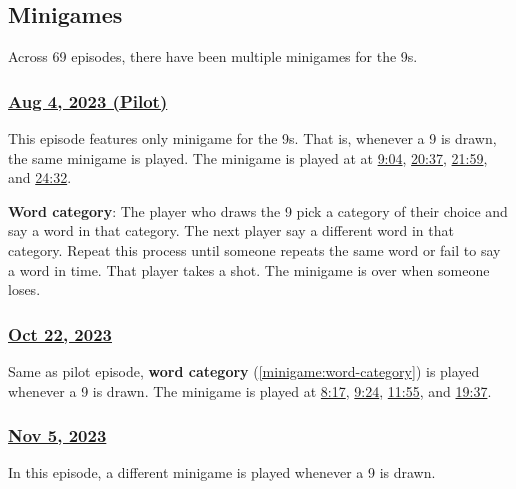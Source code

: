 \documentclass{article}
\begin{document}
\subsection{Minigames}

Across 69 episodes, there have been multiple minigames for the 9s.

\subsubsection{\href{https://www.youtu.be.com/lFEmz4D7Tao}{Aug 4, 2023 (Pilot)}}


This episode features only minigame for the 9s. That is, whenever a 9 is drawn, the same minigame is played. The minigame is played at at \href{https://youtu.be/lFEmz4D7Tao?t=544}{9:04}, \href{https://youtu.be/lFEmz4D7Tao?t=1237}{20:37}, \href{https://youtu.be/lFEmz4D7Tao?t=1319}{21:59}, and \href{https://youtu.be/lFEmz4D7Tao?t=1472}{24:32}.

\textbf{Word category}: The player who draws the 9 pick a category of their choice and say a word in that category. The next player say a different word in that category. Repeat this process until someone repeats the same word or fail to say a word in time. That player takes a shot. The minigame is over when someone loses. \label{minigame:word-category}

\subsubsection{\href{https://www.youtu.be.com/sDtQGCJdgf8}{Oct 22, 2023}}

Same as pilot episode, \textbf{word category} (\ref{minigame:word-category}) is played whenever a 9 is drawn. The minigame is played at \href{https://youtu.be/sDtQGCJdgf8?t=497}{8:17}, \href{https://youtu.be/sDtQGCJdgf8?t=564}{9:24}, \href{https://youtu.be/sDtQGCJdgf8?t=715}{11:55}, and \href{https://youtu.be/sDtQGCJdgf8?t=1177}{19:37}.

\subsubsection{\href{https://youtu.be/S_QeMzgNCyg}{Nov 5, 2023}}

In this episode, a different minigame is played whenever a 9 is drawn.
\end{document}
